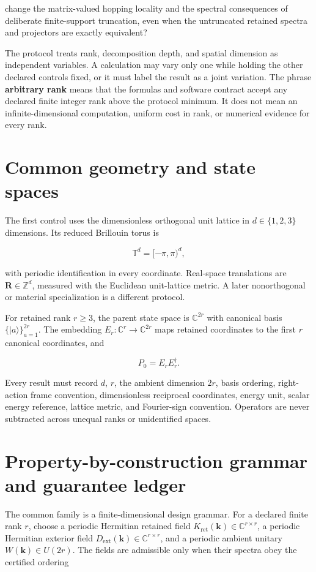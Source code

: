 \documentclass[11pt]{article}
\begin{document}
change the matrix-valued hopping locality and the spectral consequences of deliberate
finite-support truncation, even when the untruncated retained spectra and projectors are
exactly equivalent?

The protocol treats rank, decomposition depth, and spatial dimension as independent
variables. A calculation may vary only one while holding the other declared controls
fixed, or it must label the result as a joint variation. The phrase \textbf{arbitrary rank}
means that the formulas and software contract accept any declared finite integer rank
above the protocol minimum. It does not mean an infinite-dimensional computation,
uniform cost in rank, or numerical evidence for every rank.

\section{Common geometry and state spaces}

The first control uses the dimensionless orthogonal unit lattice in
$d\in\{1,2,3\}$ dimensions. Its reduced Brillouin torus is

\[
\mathbb T^d=[-\pi,\pi)^d,
\]

with periodic identification in every coordinate. Real-space translations are
$\mathbf R\in\mathbb Z^d$, measured with the Euclidean unit-lattice metric. A later
nonorthogonal or material specialization is a different protocol.

For retained rank $r\geq3$, the parent state space is $\mathbb C^{2r}$ with canonical
basis $\{|a\rangle\}_{a=1}^{2r}$. The embedding
$E_r:\mathbb C^r\rightarrow\mathbb C^{2r}$ maps retained coordinates to the first $r$
canonical coordinates, and

\[
P_0=E_rE_r^\dagger.
\]

Every result must record $d$, $r$, the ambient dimension $2r$, basis ordering, right-action
frame convention, dimensionless reciprocal coordinates, energy unit, scalar energy
reference, lattice metric, and Fourier-sign convention. Operators are never subtracted
across unequal ranks or unidentified spaces.

\section{Property-by-construction grammar and guarantee ledger}

The common family is a finite-dimensional design grammar. For a declared finite rank
$r$, choose a periodic Hermitian retained field
$K_{\mathrm{ret}}(\mathbf k)\in\mathbb C^{r\times r}$, a periodic Hermitian exterior
field $D_{\mathrm{ext}}(\mathbf k)\in\mathbb C^{r\times r}$, and a periodic ambient
unitary $W(\mathbf k)\in U(2r)$. The fields are admissible only when their spectra obey
the certified ordering
\end{document}
